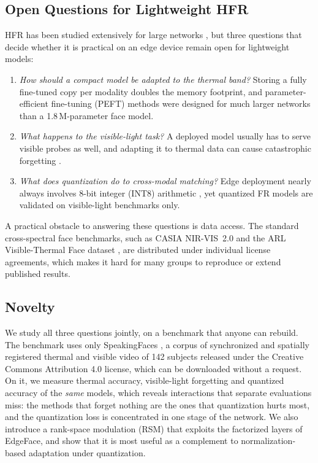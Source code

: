 \documentclass[journal]{IEEEtran}
\begin{document}
\subsection{Open Questions for Lightweight HFR}
HFR has been studied extensively for large networks \cite{sarfraz2017dpm,wu2018lightcnn,fu2019dvg,george2023pdt}, but three questions that decide whether it is practical on an edge device remain open for lightweight models:
\begin{enumerate}
  \item \emph{How should a compact model be adapted to the thermal band?} Storing a fully fine-tuned copy per modality doubles the memory footprint, and parameter-efficient fine-tuning (PEFT) methods \cite{houlsby2019adapters,benzaken2022bitfit,hu2022lora} were designed for much larger networks than a 1.8\,M-parameter face model.
  \item \emph{What happens to the visible-light task?} A deployed model usually has to serve visible probes as well, and adapting it to thermal data can cause catastrophic forgetting \cite{kirkpatrick2017ewc,li2018lwf}.
  \item \emph{What does quantization do to cross-modal matching?} Edge deployment nearly always involves 8-bit integer (INT8) arithmetic \cite{jacob2018quantization,krishnamoorthi2018whitepaper}, yet quantized FR models are validated on visible-light benchmarks only.
\end{enumerate}
A practical obstacle to answering these questions is data access. The standard cross-spectral face benchmarks, such as CASIA NIR-VIS~2.0 \cite{li2013casia} and the ARL Visible-Thermal Face dataset \cite{poster2021arlvtf}, are distributed under individual license agreements, which makes it hard for many groups to reproduce or extend published results.

\subsection{Novelty}
We study all three questions jointly, on a benchmark that anyone can rebuild. The benchmark uses only SpeakingFaces \cite{abdrakhmanova2021speakingfaces}, a corpus of synchronized and spatially registered thermal and visible video of 142 subjects released under the Creative Commons Attribution 4.0 license, which can be downloaded without a request. On it, we measure thermal accuracy, visible-light forgetting and quantized accuracy of the \emph{same} models, which reveals interactions that separate evaluations miss: the methods that forget nothing are the ones that quantization hurts most, and the quantization loss is concentrated in one stage of the network. We also introduce a rank-space modulation (RSM) that exploits the factorized layers of EdgeFace, and show that it is most useful as a complement to normalization-based adaptation under quantization.
\end{document}
